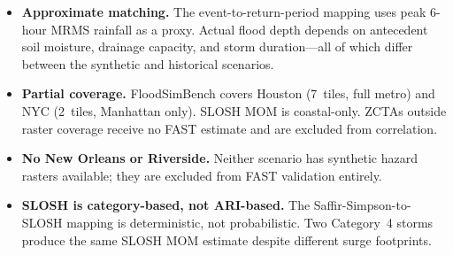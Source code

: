 \begin{itemize}
  \item \textbf{Approximate matching.}  The event-to-return-period
        mapping uses peak 6-hour MRMS rainfall as a proxy.  Actual
        flood depth depends on antecedent soil moisture, drainage
        capacity, and storm duration---all of which differ between
        the synthetic and historical scenarios.
  \item \textbf{Partial coverage.}  FloodSimBench covers Houston
        (7~tiles, full metro) and NYC (2~tiles, Manhattan only).
        SLOSH MOM is coastal-only.  ZCTAs outside raster coverage
        receive no FAST estimate and are excluded from correlation.
  \item \textbf{No New Orleans or Riverside.}  Neither scenario has
        synthetic hazard rasters available; they are excluded from
        FAST validation entirely.
  \item \textbf{SLOSH is category-based, not ARI-based.}  The
        Saffir-Simpson-to-SLOSH mapping is deterministic, not
        probabilistic.  Two Category~4 storms produce the same SLOSH
        MOM estimate despite different surge footprints.
\end{itemize}
